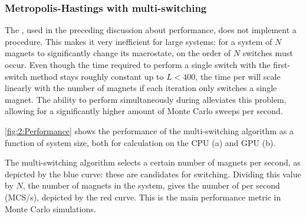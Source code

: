 \subsubsection{Metropolis-Hastings with multi-switching}
The , used in the preceding discussion about performance, does not implement a  procedure.
This makes it very inefficient for large systems: for a system of $N$ magnets to significantly change its macrostate, on the order of $N$ switches must occur.
Even though the time required to perform a single switch with the first-switch method stays roughly constant up to $L<400$, the time per  will scale linearly with the number of magnets if each iteration only switches a single magnet.
The ability to perform  simultaneously during  alleviates this problem, allowing for a significantly higher amount of Monte Carlo sweeps per second. \par
\cref{fig:2:Performance} shows the performance of the multi-switching algorithm as a function of system size, both for calculation on the CPU (a) and GPU (b).

\vspace{-1em}
\vspace{-0.5em}

The multi-switching algorithm selects a certain number of magnets per second, as depicted by the blue curve: these are candidates for switching.
Dividing this value by $N$, the number of magnets in the system, gives the number of  per second (MCS/s), depicted by the red curve.
This is the main performance metric in Monte Carlo simulations. %

